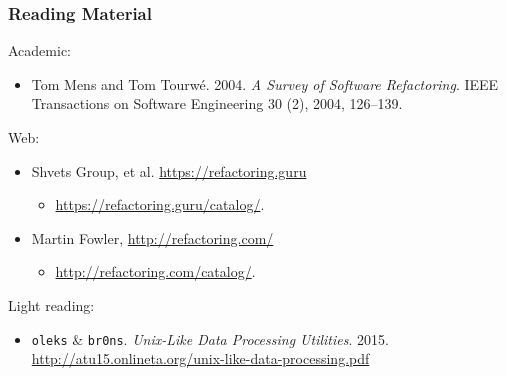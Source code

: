 \begin{frame}

\frametitle{Reading Material}

\footnotesize

Academic:

\begin{itemize}

\item Tom Mens and Tom Tourw\'e. 2004. \emph{A Survey of Software Refactoring}.
IEEE Transactions on Software Engineering 30 (2), 2004, 126--139.

\end{itemize}

Web:

\begin{itemize}

\item Shvets Group, et al. \url{https://refactoring.guru}

\begin{itemize}

\item \footnotesize \url{https://refactoring.guru/catalog/}.

\end{itemize}

\item Martin Fowler, \url{http://refactoring.com/}

\begin{itemize}

\item \footnotesize \url{http://refactoring.com/catalog/}.

\end{itemize}

\end{itemize}

Light reading:

\begin{itemize}

\item \texttt{oleks} \& \texttt{br0ns}. \emph{Unix-Like Data Processing
Utilities}. 2015. \url{http://atu15.onlineta.org/unix-like-data-processing.pdf}

\end{itemize}

\end{frame}


